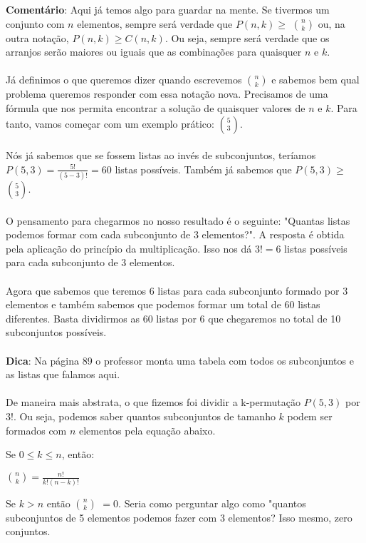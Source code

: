 \documentclass[main.tex]{subfiles}
\begin{document}
\textbf{Comentário}: Aqui já temos algo para guardar na mente. Se tivermos um conjunto com $n$ elementos, sempre será verdade que $P(n,k) \geqslant $ $n \choose k$ ou, na outra notação, $P(n,k) \geqslant C(n,k)$. Ou seja, sempre será verdade que os arranjos serão maiores ou iguais que as combinações para quaisquer $n$ e $k$.
\\~\\
Já definimos o que queremos dizer quando escrevemos $n \choose k$ e sabemos bem qual problema queremos responder com essa notação nova. Precisamos de uma fórmula que nos permita encontrar a solução de quaisquer valores de $n$ e $k$. Para tanto, vamos começar com um exemplo prático: $5 \choose 3$.
\\~\\
Nós já sabemos que se fossem listas ao invés de subconjuntos, teríamos $P(5,3) = \frac{5!}{(5 - 3)!} = 60$ listas possíveis. Também já sabemos que $P(5,3) \geqslant $ $5 \choose 3$.
\\~\\
O pensamento para chegarmos no nosso resultado é o seguinte: "Quantas listas podemos formar com cada subconjunto de 3 elementos?". A resposta é obtida pela aplicação do princípio da multiplicação. Isso nos dá $3! = 6$ listas possíveis para cada subconjunto de 3 elementos.
\\~\\
Agora que sabemos que teremos 6 listas para cada subconjunto formado por 3 elementos e também sabemos que podemos formar um total de 60 listas diferentes. Basta dividirmos as 60 listas por 6 que chegaremos no total de 10 subconjuntos possíveis.
\\~\\
\textbf{Dica}: Na página 89 o professor monta uma tabela com todos os subconjuntos e as listas que falamos aqui.
\\~\\
De maneira mais abstrata, o que fizemos foi dividir a k-permutação $P(5,3)$ por $3!$. Ou seja, podemos saber quantos subconjuntos de tamanho $k$ podem ser formados com $n$ elementos pela equação abaixo.

\begin{fact}
Se $0 \leq k \leq n$, então:
\begin{center}
 \Large ${n \choose k} = \frac{n!}{k!(n-k)!}$
\end{center}
\end{fact}

Se $k > n$ então $n \choose k$ $= 0$. Seria como perguntar algo como "quantos subconjuntos de 5 elementos podemos fazer com 3 elementos? Isso mesmo, zero conjuntos.
\end{document}
